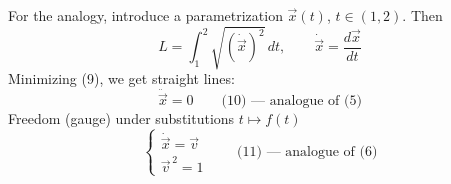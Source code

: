For the analogy, introduce a parametrization $\vec{x}(t)$, $t\in(1,2)$. Then
\begin{equation*}
L=\int_1^2\sqrt{(\dot{\vec{x}})^2}\,dt,\qquad
\dot{\vec{x}}=\frac{d\vec{x}}{dt}
\tag{9}
\end{equation*}
Minimizing (9), we get straight lines:
\begin{equation*}
\ddot{\vec{x}}=0\qquad\text{(10) — analogue of (5)}
\tag{10}
\end{equation*}
Freedom (gauge) under substitutions $t\mapsto f(t)$
\begin{equation*}
\begin{cases}
\dot{\vec{x}}=\vec{v}\\
\vec{v}^{\,2}=1
\end{cases}
\qquad\text{(11) — analogue of (6)}
\tag{11}
\end{equation*}



